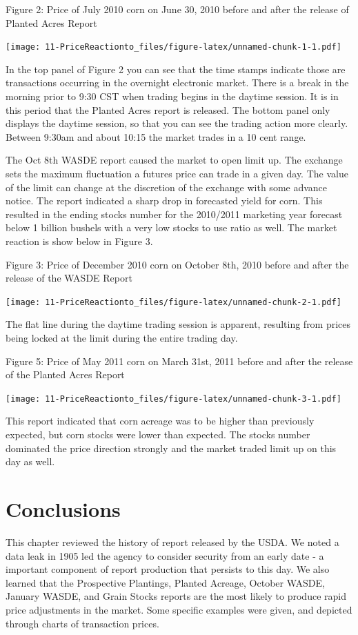 \documentclass[
]{book}
\begin{document}
Figure 2: Price of July 2010 corn on June 30, 2010 before and after the release of Planted Acres Report

\texttt{[image: 11-PriceReactionto\_files/figure-latex/unnamed-chunk-1-1.pdf]}

In the top panel of Figure 2 you can see that the time stamps indicate those are transactions occurring in the overnight electronic market. There is a break in the morning prior to 9:30 CST when trading begins in the daytime session. It is in this period that the Planted Acres report is released. The bottom panel only displays the daytime session, so that you can see the trading action more clearly. Between 9:30am and about 10:15 the market trades in a 10 cent range.

The Oct 8th WASDE report caused the market to open limit up. The exchange sets the maximum fluctuation a futures price can trade in a given day. The value of the limit can change at the discretion of the exchange with some advance notice. The report indicated a sharp drop in forecasted yield for corn. This resulted in the ending stocks number for the 2010/2011 marketing year forecast below 1 billion bushels with a very low stocks to use ratio as well. The market reaction is show below in Figure 3.

Figure 3: Price of December 2010 corn on October 8th, 2010 before and after the release of the WASDE Report

\texttt{[image: 11-PriceReactionto\_files/figure-latex/unnamed-chunk-2-1.pdf]}

The flat line during the daytime trading session is apparent, resulting from prices being locked at the limit during the entire trading day.

Figure 5: Price of May 2011 corn on March 31st, 2011 before and after the release of the Planted Acres Report

\texttt{[image: 11-PriceReactionto\_files/figure-latex/unnamed-chunk-3-1.pdf]}

This report indicated that corn acreage was to be higher than previously expected, but corn stocks were lower than expected. The stocks number dominated the price direction strongly and the market traded limit up on this day as well.

\hypertarget{conclusions}{%
\section{Conclusions}\label{conclusions}}

This chapter reviewed the history of report released by the USDA. We noted a data leak in 1905 led the agency to consider security from an early date - a important component of report production that persists to this day. We also learned that the Prospective Plantings, Planted Acreage, October WASDE, January WASDE, and Grain Stocks reports are the most likely to produce rapid price adjustments in the market. Some specific examples were given, and depicted through charts of transaction prices.
\end{document}
